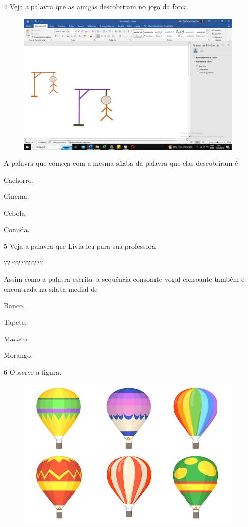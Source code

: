 \num{4} Veja a palavra que as amigas descobriram no jogo da forca.

\begin{figure}[htpb!]
\centering
\includegraphics[width=.2\textwidth]{media/image166.png}
\end{figure}

A palavra que começa com a mesma sílaba da palavra que elas descobriram é

\begin{escolha}
\item Cachorro.

\item Cinema.

\item Cebola.

\item Comida.
\end{escolha}

\num{5} Veja a palavra que Lívia leu para sua professora.

\begin{myquote}
????????????
\end{myquote}

Assim como a palavra escrita, a sequência consoante vogal consoante também é encontrada na sílaba medial de

\begin{escolha}
\item Banco.

\item Tapete.

\item Macaco.

\item Morango.
\end{escolha}

\num{6} Observe a figura.

\begin{figure}[htpb!]
\centering
\includegraphics[width=.5\textwidth]{media/image167.jpeg}
\end{figure}

